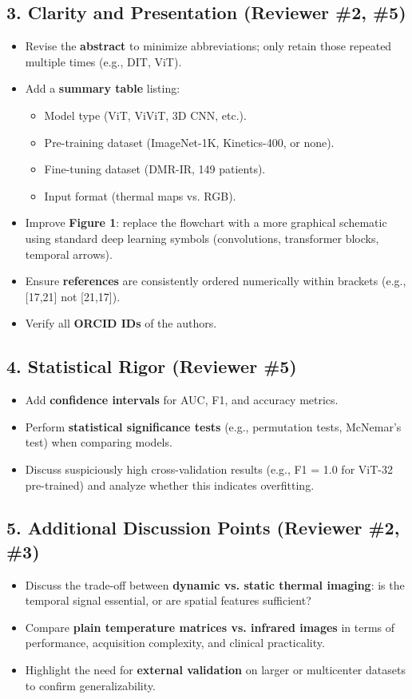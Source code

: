 \subsection*{3. Clarity and Presentation (Reviewer \#2, \#5)}
\begin{itemize}
\item Revise the \textbf{abstract} to minimize abbreviations; only
  retain those repeated multiple times (e.g., DIT, ViT).
    \item Add a \textbf{summary table} listing:
    \begin{itemize}
        \item Model type (ViT, ViViT, 3D CNN, etc.).
        \item Pre-training dataset (ImageNet-1K, Kinetics-400, or none).
        \item Fine-tuning dataset (DMR-IR, 149 patients).
        \item Input format (thermal maps vs. RGB).
    \end{itemize}
  \item Improve \textbf{Figure 1}: replace the flowchart with a more
    graphical schematic using standard deep learning symbols
    (convolutions, transformer blocks, temporal arrows).
  \item Ensure \textbf{references} are consistently ordered
    numerically within brackets (e.g., [17,21] not [21,17]).
  \item Verify all \textbf{ORCID IDs} of the authors.
\end{itemize}

\subsection*{4. Statistical Rigor (Reviewer \#5)}
\begin{itemize}
\item Add \textbf{confidence intervals} for AUC, F1, and accuracy
  metrics.
\item Perform \textbf{statistical significance tests} (e.g.,
  permutation tests, McNemar’s test) when comparing models.
\item Discuss suspiciously high cross-validation results (e.g., F1 =
  1.0 for ViT-32 pre-trained) and analyze whether this indicates
  overfitting.
\end{itemize}

\subsection*{5. Additional Discussion Points (Reviewer \#2, \#3)}
\begin{itemize}
\item Discuss the trade-off between \textbf{dynamic vs. static thermal
    imaging}: is the temporal signal essential, or are spatial
  features sufficient?
\item Compare \textbf{plain temperature matrices vs. infrared images}
  in terms of performance, acquisition complexity, and clinical
  practicality.
\item Highlight the need for \textbf{external validation} on larger or
  multicenter datasets to confirm generalizability.
\end{itemize}

